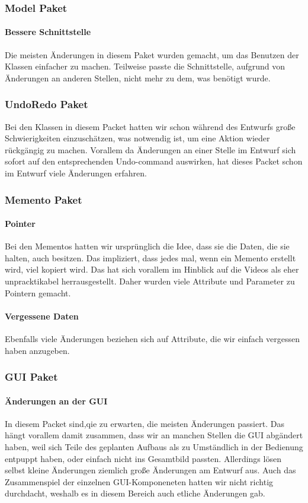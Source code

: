 \documentclass{scrartcl}
\begin{document}
{\subsubsection{Model Paket}
\paragraph{Bessere Schnittstelle} Die meisten Änderungen in diesem Paket wurden gemacht, um das Benutzen der Klassen einfacher zu machen. Teilweise passte die Schnittstelle, aufgrund von Änderungen an anderen Stellen, nicht mehr zu dem, was benötigt wurde. 
\bigskip
\subsubsection{UndoRedo Paket}
Bei den Klassen in diesem Packet hatten wir schon während des Entwurfs große Schwierigkeiten einzuschätzen, was notwendig ist, um eine Aktion wieder rückgängig zu machen. Vorallem da Änderungen an einer Stelle im Entwurf sich sofort auf den entsprechenden Undo-command auswirken, hat dieses Packet schon im Entwurf viele Änderungen erfahren.
\bigskip
\subsubsection{Memento Paket}
\paragraph{Pointer} Bei den Mementos hatten wir ursprünglich die Idee, dass sie die Daten, die sie halten, auch besitzen. Das impliziert, dass jedes mal, wenn ein Memento erstellt wird, viel kopiert wird. Das hat sich vorallem im Hinblick auf die Videos als eher unpracktikabel herrausgestellt. Daher wurden viele Attribute und Parameter zu Pointern gemacht.
\paragraph{Vergessene Daten} Ebenfalls viele Änderungen beziehen sich auf Attribute, die wir einfach vergessen haben anzugeben.
\bigskip
\subsubsection{GUI Paket}
\paragraph{Änderungen an der GUI} In diesem Packet sind,qie zu erwarten, die meisten Änderungen passiert. Das hängt vorallem damit zusammen, dass wir an manchen Stellen die GUI abgändert haben, weil sich Teile des geplanten Aufbaus als zu Umständlich in der Bedienung entpuppt haben, oder einfach nicht ins Gesamtbild passten. Allerdings lösen selbst kleine Änderungen ziemlich große Änderungen am Entwurf aus. Auch das Zusammenspiel der einzelnen GUI-Komponeneten hatten wir nicht richtig durchdacht, weshalb es in diesem Bereich auch etliche Änderungen gab.
\newpage
}
\end{document}
